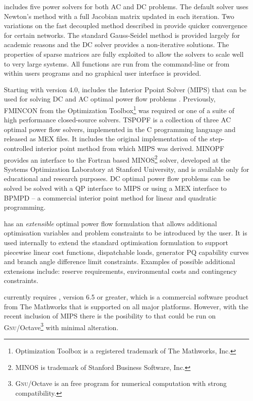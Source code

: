 \matpower includes five power solvers for both AC and DC problems.  The default
solver uses Newton's method \cite{tinney:67} with a full Jacobian matrix
updated in each iteration.  Two variations on the fast decoupled method
\cite{stott:74} described in \cite{amerongen:89} provide quicker convergence
for certain networks.  The standard Gauss-Seidel method \cite{glimn:57} is provided
largely for academic reasons and the DC solver provides a non-iterative
solutions.  The properties of \matlab sparse matrices are fully exploited to
allow the solvers to scale well to very large systems.  All functions are run
from the \matlab command-line or from within users programs and no graphical
user interface is provided.

Starting with version 4.0, \matpower includes the
\matlab Interior Ppoint Solver (MIPS) that can be used for solving
DC and AC optimal power flow problems \cite{zimmerman:ccv}.  Previously,
FMINCON from the \matlab Optimization Toolbox\footnote{Optimization
Toolbox is a registered trademark of The Mathworks, Inc.} was required or one
of a suite of high performance closed-source solvers.  TSPOPF is a
collection of three AC optimal power flow solvers, implemented in the C
programming language and released as \matlab MEX files.  It includes
the original implementation of the step-controlled interior point method from
which MIPS was derived.  MINOPF provides an interface to the
Fortran based MINOS\footnote{MINOS is trademark of Stanford
Business Software, Inc.} solver, developed at the Systems Optimization
Laboratory at Stanford University, and is available only for educational and
research purposes. DC optimal power flow problems can be solved be solved with
a QP interface to MIPS or using a MEX interface to BPMPD -- a commercial
interior point method for linear and quadratic programming.

\matpower has an \textit{extensible} optimal power flow formulation that allows
additional optimisation variables and problem constraints to be introduced by
the user.  It is used internally to extend the standard optimisation
formulation to support piecewise linear cost functions, dispatchable loads,
generator PQ capability curves and branch angle difference limit constraints.
Examples of possible additional extensions include: reserve requirements,
environmental costs and contingency constraints.

\matpower currently requires \matlab, version 6.5 or greater, which is a
commercial software product from The Mathworks that is supported on all
major platforms.  However, with the recent inclusion of MIPS there is
the posibility to that \matpower could be run on
\textsc{Gnu}/Octave\footnote{\textsc{Gnu}/Octave is an free program for
numerical computation with strong \matlab compatibility.} with minimal
alteration.

